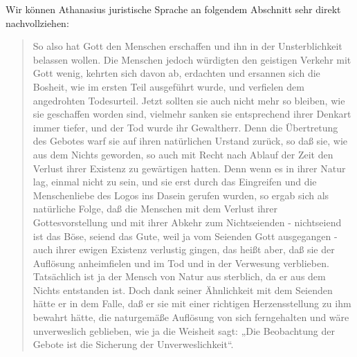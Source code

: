 Wir können Athanasius juristische Sprache an folgendem Abschnitt sehr direkt nachvollziehen:
\begin{quote}
So also hat Gott den Menschen erschaffen und ihn in der Unsterblichkeit belassen wollen.
Die Menschen jedoch würdigten den geistigen Verkehr mit Gott wenig, kehrten sich
davon ab, erdachten und ersannen sich die Bosheit, wie im ersten Teil ausgeführt wurde,
und verfielen dem angedrohten Todesurteil. Jetzt sollten sie auch nicht mehr so bleiben,
wie sie geschaffen worden sind, vielmehr sanken sie entsprechend ihrer Denkart immer
tiefer, und der Tod wurde ihr Gewaltherr. Denn die Übertretung des Gebotes warf sie auf
ihren natürlichen Urstand zurück, so daß sie, wie aus dem Nichts geworden, so auch mit
Recht nach Ablauf der Zeit den Verlust ihrer Existenz zu gewärtigen hatten.
Denn wenn
es in ihrer Natur lag, einmal nicht zu sein, und sie erst durch das Eingreifen und die Menschenliebe des Logos ins Dasein gerufen wurden,
so ergab sich als natürliche Folge, daß die Menschen mit dem Verlust ihrer Gottesvorstellung und mit ihrer Abkehr zum Nichtseienden
- nichtseiend ist das Böse, seiend das Gute, weil ja vom Seienden Gott ausgegangen -
auch ihrer ewigen Existenz verlustig gingen, das heißt aber, daß sie der Auflösung anheimfielen und im Tod und in der Verwesung verblieben.
Tatsächlich ist ja der Mensch von
Natur aus sterblich, da er aus dem Nichts entstanden ist. Doch dank seiner Ähnlichkeit
mit dem Seienden hätte er in dem Falle, daß er sie mit einer richtigen Herzensstellung zu
ihm bewahrt hätte, die naturgemäße Auflösung von sich ferngehalten und wäre unverweslich geblieben, wie ja die Weisheit sagt: „Die Beobachtung der Gebote ist die Sicherung der
Unverweslichkeit“.
\end{quote}

